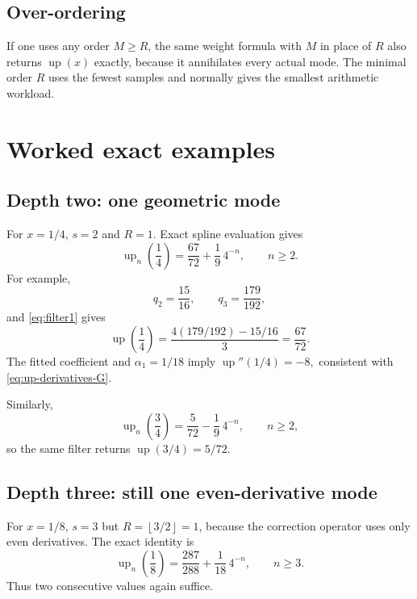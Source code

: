 \documentclass[11pt]{article}
\theoremstyle{definition}
\theoremstyle{remark}
\newcommand{\rv}{\operatorname{up}}
\newcommand{\floor}[1]{\left\lfloor #1\right\rfloor}
\begin{document}
\subsection{Over-ordering}

If one uses any order \(M\ge R\), the same weight formula with \(M\) in place
of \(R\) also returns \(\rv(x)\) exactly, because it annihilates every actual
mode.  The minimal order \(R\) uses the fewest samples and normally gives the
smallest arithmetic workload.

\section{Worked exact examples}

\subsection{Depth two: one geometric mode}

For \(x=1/4\), \(s=2\) and \(R=1\).  Exact spline evaluation gives
\begin{equation}
 \rv_n\!\left(\frac14\right)
 =\frac{67}{72}+\frac19\,4^{-n},
 \qquad n\ge2.
 \label{eq:x-quarter-model}
\end{equation}
For example,
\[
 q_2=\frac{15}{16},\qquad q_3=\frac{179}{192},
\]
and \cref{eq:filter1} gives
\begin{equation}
 \rv\!\left(\frac14\right)
 =\frac{4(179/192)-15/16}{3}=\frac{67}{72}.
 \label{eq:x-quarter-extract}
\end{equation}
The fitted coefficient and \(\alpha_1=1/18\) imply
\(
 \rv''(1/4)=-8,
\)
consistent with \cref{eq:up-derivatives-G}.

Similarly,
\begin{equation}
 \rv_n\!\left(\frac34\right)
 =\frac{5}{72}-\frac19\,4^{-n},
 \qquad n\ge2,
 \label{eq:x-three-quarter-model}
\end{equation}
so the same filter returns \(\rv(3/4)=5/72\).

\subsection{Depth three: still one even-derivative mode}

For \(x=1/8\), \(s=3\) but \(R=\floor{3/2}=1\), because the correction
operator uses only even derivatives.  The exact identity is
\begin{equation}
 \rv_n\!\left(\frac18\right)
 =\frac{287}{288}+\frac1{18}\,4^{-n},
 \qquad n\ge3.
 \label{eq:x-eighth-model}
\end{equation}
Thus two consecutive values again suffice.
\end{document}
